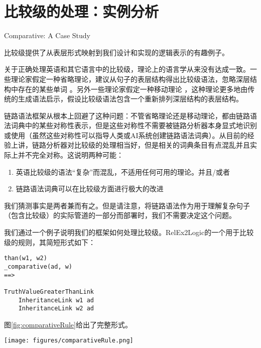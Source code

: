\section{比较级的处理：实例分析}{Comparative: A Case Study}  

比较级提供了从表层形式映射到我们设计和实现的逻辑表示的有趣例子。

关于正确处理英语和其它语言中的比较级，理论上的语言学从来没有达成一致。一些理论家假定一种省略理论，建议从句子的表层结构得出比较级语法，忽略深层结构中存在的某些单词\cite{lechner2004ellipsis} \cite{Bhatt2011}。另外一些理论家假定一种移动理论\cite{Margaret2013} \cite{Roumyana1995}，这种理论更多地由传统的生成语法启示，假设比较级语法包含一个重新排列深层结构的表层结构。

链路语法框架从根本上回避了这种问题：不管省略理论还是移动理论，都由链路语法词典中的某些对称性表示，但是这些对称性不需要被链路分析器本身显式地识别或使用（虽然这些对称性可以指导人类或AI系统创建链路语法词典）。从目前的经验上讲，链路分析器对比较级的处理相当好，但是相关的词典条目有点混乱并且实际上并不完全对称。这说明两种可能：

\begin{enumerate}
\item 英语比较级的语法“复杂”而混乱，不适用任何可用的理论。并且/或者
\item 链路语法词典可以在比较级方面进行极大的改进
\end{enumerate}

我们猜测事实是两者兼而有之。但是请注意，将链路语法作为用于理解复杂句子（包含比较级）的实际管道的一部分而部署时，我们不需要决定这个问题。

我们通过一个例子说明我们的框架如何处理比较级。RelEx2Logic的一个用于比较级的规则，其简短形式如下：

 {\tt\begin{small}\begin{lstlisting}
than(w1, w2)
_comparative(ad, w)
==>

TruthValueGreaterThanLink
    InheritanceLink w1 ad
    InheritanceLink w2 ad
\end{lstlisting}\end{small}}

图\ref{fig:comparativeRule}给出了完整形式。

\begin{figure*}
\begin{centering}
\texttt{[image: figures/comparativeRule.png]}
\protect\caption{\label{fig:comparativeRule}Full RelEx2Logic rule for parsing one type of comparative sentence.}
\end{centering}
\end{figure*}

